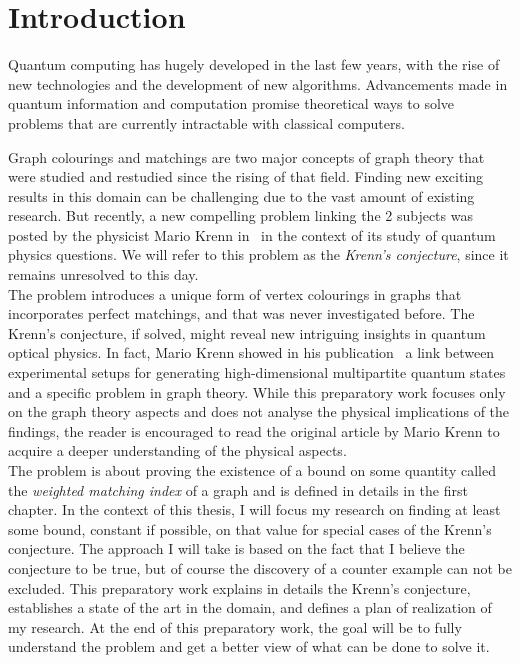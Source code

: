 \setcounter{secnumdepth}{-1}

\chapter{Introduction}
\label{ch:introduction}

Quantum computing has hugely developed in the last few years, with the rise of new technologies and the development of new algorithms.
Advancements made in quantum information and computation promise theoretical ways to solve problems that are currently intractable with classical computers.



Graph colourings and matchings are two major concepts of graph theory that were studied and restudied since the rising of that field.
Finding new exciting results in this domain can be challenging due to the vast amount of existing research.
But recently, a new compelling problem linking the 2 subjects was posted by the physicist Mario Krenn in~\cite{wordpress} in the context of its study of quantum physics questions.
We will refer to this problem as the \textit{Krenn's conjecture}, since it remains unresolved to this day.\\

The problem introduces a unique form of vertex colourings in graphs that incorporates perfect matchings, and that was never investigated before.
The Krenn's conjecture, if solved, might reveal new intriguing insights in quantum optical physics.
In fact, Mario Krenn showed in his publication~\cite{Krenn_2017} a link between experimental setups for generating high-dimensional multipartite quantum states and a specific problem in graph theory.
While this preparatory work focuses only on the graph theory aspects and does not analyse the physical implications of the findings, the reader is encouraged to read the original article by Mario Krenn to acquire a deeper understanding of the physical aspects. \\

The problem is about proving the existence of a bound on some quantity called the \textit{weighted matching index} of a graph and is defined in details in the first chapter. In the context of this thesis, I will focus my research on finding at least some bound, constant if possible, on that value for special cases of the Krenn's conjecture. The approach I will take is based on the fact that I believe the conjecture to be true, but of course the discovery of a counter example can not be excluded. This preparatory work explains in details the Krenn's conjecture, establishes a state of the art in the domain, and defines a plan of realization of my research. At the end of this preparatory work, the goal will be to fully understand the problem and get a better view of what can be done to solve it.